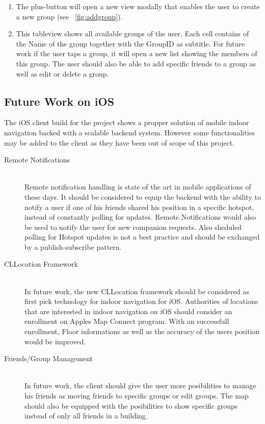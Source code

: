 \begin{enumerate}
 \item The plus-button will open a new view modally that enables the user to create a new group (see ~\ref{fig:addgroup}).
 \item This tableview shows all available groups of the user. Each cell contains of the Name of the group together with the GroupID as subtitle. For future work if the user taps a group, it will open a new list showing the members of this group. The user should also be able to add specific friends to a group as well as edit or delete a group.
\end{enumerate} 


\subsection{Future Work on iOS}
The iOS client build for the project shows a propper solution of mobile indoor navigation backed with a scalable backend system. However some functionalities may be added to the client as they have been out of scope of this project.

\begin{description}
  \item[Remote Notifications] \hfill \\
  Remote notification handling is state of the art in mobile applications of these days. It should be considered to equip the backend with the ability to notify a user if one of his friends shared his position in a specific hotspot, instead of constantly polling for updates. Remote Notifications would also be used to notify the user for new companion requests. Also sheduled polling for Hotspot updates is not a best practice and should be exchanged by a publish-subscribe pattern.
  \item[CLLocation Framework] \hfill \\
  In future work, the new CLLocation framework should be considered as first pick technology for indoor navigation for iOS. Authorities of locations that are interested in indoor navigation on iOS should consider an enrollment on Apples Map Connect program. With an successfull enrollment, Floor informations as well as the accuracy of the users position would be improved.
  \item[Friends/Group Management] \hfill \\
  In future work, the client should give the user more posibilities to manage his friends as moving friends to specific groups or edit groups. The map should also be equipped with the posibilities to show specific groups instead of only all friends in a building.
  
\end{description}